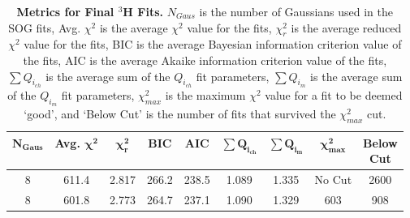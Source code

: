 
\vspace{6mm}
\begin{table}[!h]
\centering
\begin{tabular}{|c c c c c c c c c|}
\hline
\textbf{$\boldsymbol{N_{Gaus}}$} & \textbf{Avg. $\boldsymbol{\chi^2}$} & \textbf{$\boldsymbol{\chi^2_r}$} & \textbf{BIC} & \textbf{AIC} & \textbf{$\boldsymbol{\sum Q_{i_{ch}}}$} & \textbf{$\boldsymbol{\sum Q_{i_{m}}}$} & \textbf{$\boldsymbol{\chi^2_{max}}$} & \makecell{\textbf{Below}\\ \textbf{Cut}} \\
\hline
8 & 611.4 & 2.817 & 266.2 & 238.5 & 1.089 & 1.335 & No Cut & 2600\\
8 & 601.8 & 2.773 & 264.7 & 237.1 & 1.090 & 1.329 & 603 & 908\\
\hline
\end{tabular}
\caption[Metrics for Final $^3$H Fits]{{\bf{Metrics for Final $^3$H Fits.}} $N_{Gaus}$ is the number of Gaussians used in the SOG fits, Avg. $\chi^2$ is the average $\chi^2$ value for the fits, $\chi^2_r$ is the average reduced $\chi^2$ value for the fits, BIC is the average Bayesian information criterion value of the fits, AIC is the average Akaike information criterion value of the fits, $\sum Q_{i_{ch}}$ is the average sum of the $Q_{i_{ch}}$ fit parameters, $\sum Q_{i_{m}}$ is the average sum of the $Q_{i_{m}}$ fit parameters, $\chi^2_{max}$ is the maximum $\chi^2$ value for a fit to be deemed `good', and `Below Cut' is the number of fits that survived the $\chi^2_{max}$ cut.}
\label{tab:3h_fits}
\end{table}

